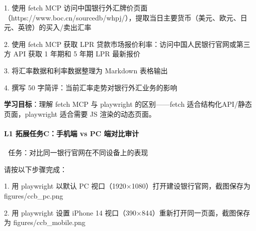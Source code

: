 \documentclass[
  american,
  chinese,
]{ctexart}
\begin{document}
\foreignlanguage{american}{1. }{使用}\foreignlanguage{american}{ fetch MCP }{访问中国银行外汇牌价页面}\foreignlanguage{american}{（}\foreignlanguage{american}{https://www.boc.cn/sourcedb/whpj/}{），提取当日主要货币（美元、欧元、日元、英镑）的买入}{/}{卖出汇率}\foreignlanguage{american}{}

\foreignlanguage{american}{2. }{使用}\foreignlanguage{american}{ fetch MCP }{获取}\foreignlanguage{american}{ LPR }{{贷款市场}}{报价利率：访问中国人民银行官网或第三方}\foreignlanguage{american}{ API }{获取}\foreignlanguage{american}{ 1 }{年期和}\foreignlanguage{american}{ 5 }{年期}\foreignlanguage{american}{ LPR }{最新报价}\foreignlanguage{american}{}

\foreignlanguage{american}{3. }{将汇率数据和利率数据整理为}\foreignlanguage{american}{ Markdown }{表格输出}\foreignlanguage{american}{}

\foreignlanguage{american}{4. }{撰写}\foreignlanguage{american}{ 50 }{{字简评}}{：当前汇率走势对银行外汇业务的影响}\foreignlanguage{american}{}

\textbf{{学习目标}}{：理解}\foreignlanguage{american}{ fetch MCP }{{与}\foreignlanguage{american}{ playwright }}{的区别------}\foreignlanguage{american}{fetch }{适合结构化}\foreignlanguage{american}{API/}{静态页面，}\foreignlanguage{american}{playwright }{适合需要}\foreignlanguage{american}{ JS }{渲染的动态页面。}\foreignlanguage{american}{}

\paragraph{\texorpdfstring{\foreignlanguage{american}{L1 }{拓展任务C：手机端}\foreignlanguage{american}{ vs PC }{端对比审计}}{L1 拓展任务C：手机端 vs PC 端对比审计}}\label{l1-ext-c-compare}

\foreignlanguage{american}{📱 }{任务：对比同一银行官网在不同设备上的表现}\foreignlanguage{american}{}

{请按以下步骤完成：}\foreignlanguage{american}{}

\foreignlanguage{american}{1. }{用}\foreignlanguage{american}{ playwright }{以默认}\foreignlanguage{american}{ PC }{视口（}\foreignlanguage{american}{1920×1080}{）打开建设银行官网，截图保存为}\foreignlanguage{american}{ figures/ccb\_pc.png}\foreignlanguage{american}{}

\foreignlanguage{american}{2. }{用}\foreignlanguage{american}{ playwright }{设置}\foreignlanguage{american}{ iPhone 14 }{视口（}\foreignlanguage{american}{390×844}{）重新打开同一页面，截图保存为}\foreignlanguage{american}{ figures/ccb\_mobile.png}\foreignlanguage{american}{}
\end{document}
